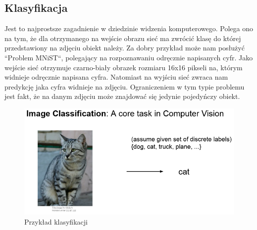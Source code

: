 \documentclass{article}
\begin{document}
\subsection{Klasyfikacja}
Jest to najprostsze zagadnienie w dziedzinie widzenia komputerowego.
Polega ono na tym, że dla otrzymanego na wejście obrazu sieć ma zwrócić klasę do której przedstawiony na zdjęciu obiekt należy.
Za dobry przykład może nam posłużyć ``Problem MNiST``, polegający na rozpoznawaniu odręcznie napisanych cyfr.
Jako wejście sieć otrzymuje czarno-biały obrazek rozmiaru 16x16 pikseli na, którym widnieje odręcznie napisana cyfra.
Natomiast na wyjściu sieć zwraca nam predykcję jaka cyfra widnieje na zdjęciu.
Ograniczeniem w tym typie problemu jest fakt, że na danym zdjęciu może znajdować się jedynie pojedyńczy obiekt.
\begin{figure}[h!]
  \centering
  \includegraphics[width=\linewidth]{images/klasyfikacja.png}
  \caption{Przykład klasyfikacji}
  \label{fig:klasyfikacja}
\end{figure}
\end{document}
